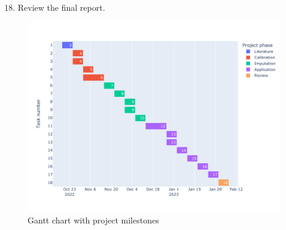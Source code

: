 \documentclass[twocolumn]{article}
\begin{document}
\begin{enumerate}
    \setcounter{enumi}{17}
    \item Review the final report.
\end{enumerate}

\begin{figure}[ht]
    \centering
    \includegraphics[width=1.0\textwidth]{gantt_chart.pdf}
    \caption{Gantt chart with project milestones}
    \label{gantt_chart}
\end{figure}



\end{document}
